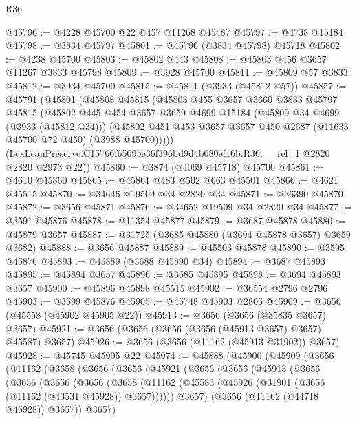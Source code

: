 \begin{lexlean}{R36}
\begin{coremodule}
@45796 := @4228 @45700 @22 @457 @11268 @45487
@45797 := @4738 @15184
@45798 := @3834 @45797
@45801 := @45796 (@3834 @45798) @45718
@45802 := @4238 @45700
@45803 := @45802 @443
@45808 := @45803 @456 @3657 @11267 @3833 @45798
@45809 := @3928 @45700
@45811 := @45809 @57 @3833
@45812 := @3934 @45700
@45815 := @45811 (@3933 (@45812 @57))
@45857 := @45791
    (@45801
      (@45808
        @45815
        (@45803
          @455
          @3657
          @3660
          @3833
          @45797
          @45815
          (@45802
            @445
            @454
            @3657
            @3659
            @4699
            @15184
            (@45809 @34 @4699 (@3933 (@45812 @34)))
            (@45802 @451 @453 @3657 @3657 @450 @2687 (@11633 @45700 @72 @450) (@3988 @45700)))))
      (LexLeanPreserve.C15766f65095e36f396bd9d4b080ef16b.R36.__rel_1 @2820 @2820 @2973 @22))
@45860 := @3874 (@4069 @45718) @45700
@45861 := @4610 @45860
@45865 := @45861 @483 @502 @663 @45501
@45866 := @4621 @45515
@45870 := @34646 @19509 @34 @2820 @34
@45871 := @36390 @45870
@45872 := @3656 @45871
@45876 := @34652 @19509 @34 @2820 @34
@45877 := @3591 @45876
@45878 := @11354 @45877
@45879 := @3687 @45878
@45880 := @45879 @3657
@45887 := @31725 (@3685 @45880 (@3694 @45878 @3657) @3659 @3682)
@45888 := @3656 @45887
@45889 := @45503 @45878
@45890 := @3595 @45876
@45893 := @45889 (@3688 @45890 @34)
@45894 := @3687 @45893
@45895 := @45894 @3657
@45896 := @3685 @45895
@45898 := @3694 @45893 @3657
@45900 := @45896 @45898 @45515
@45902 := @36554 @2796 @2796
@45903 := @3599 @45876
@45905 := @45748 @45903 @2805
@45909 := @3656 (@45558 (@45902 @45905 @22))
@45913 := @3656 (@3656 (@35835 @3657) @3657)
@45921 := @3656 (@3656 (@3656 (@3656 (@45913 @3657) @3657) @45587) @3657)
@45926 := @3656 (@3656 (@11162 (@45913 @31902)) @3657)
@45928 := @45745 @45905 @22
@45974 := @45888
    (@45900
      (@45909
        (@3656
          (@11162
            (@3658
              (@3656
                (@3656
                  (@45921
                    (@3656
                      (@3656
                        (@45913
                          (@3656
                            (@3656
                              (@3656
                                (@3656
                                  (@3658
                                    (@11162
                                      (@45583
                                        (@45926 (@31901 (@3656 (@11162 (@43531 @45928)) @3657))))))
                                  @3657)
                                (@3656 (@11162 (@44718 @45928)) @3657))
                              @3657)

\end{coremodule}
\end{lexlean}

